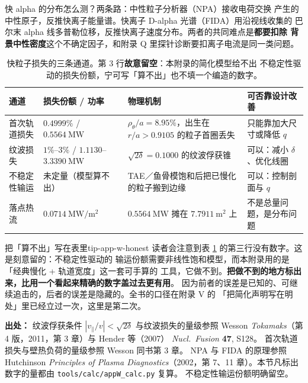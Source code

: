 快 alpha 的分布怎么测？两条路：中性粒子分析器（NPA）接收电荷交换
产生的中性原子，反推快离子能量谱。快离子 D-alpha 光谱（FIDA）用沿视线收集的
巴尔末 alpha 线多普勒位移，反推快离子速度分布。两者的共同难点是\textbf{都要扣除
背景中性密度}这个不确定因子，和附录 Q 里探针诊断要扣离子电流是同一类问题。

\begin{table}[htbp]
\centering
\caption{快粒子损失的三条通道。第 3 行\textbf{故意留空}：本附录的简化模型给不出
不稳定性驱动的损失份额，宁可写「算不出」也不填一个编造的数字。}
\label{tab:app-w-loss}
\begin{tabular}{@{}p{2.4cm}p{2.7cm}p{3.2cm}p{3.5cm}@{}}
\hline
通道 & 损失份额 / 功率 & 物理机制 & 可否靠设计改善 \\
\hline
首次轨道损失 & $0.4999\%$ / $0.5564\ \mathrm{MW}$ &
$\rho_\theta/a=8.95\%$，出生在 $r/a>0.9105$ 的粒子首圈丢失 &
只能靠加大尺寸或降低 $q$ \\
纹波损失 & $1\%$--$3\%$ / $1.1130$--$3.3390\ \mathrm{MW}$ &
$\sqrt{2\delta}=0.1000$ 的纹波俘获锥 & 可以：减小 $\delta$、优化线圈 \\
不稳定性输运 & 未定量（模型算不出） &
TAE／鱼骨模饱和后把已慢化的粒子搬到边缘 & 可以：控制剖面与 $q$ \\
\hline
落点热流 & $0.0714\ \mathrm{MW/m^2}$ &
$0.5564\ \mathrm{MW}$ 摊在 $7.7911\ \mathrm{m^2}$ 上 &
不是总量问题，是分布问题 \\
\hline
\end{tabular}

\end{table}

\begin{tip}{把「算不出」写在表里}{tip-app-w-honest}
读者会注意到表 \ref{tab:app-w-loss} 的第三行没有数字。这是刻意留的：不稳定性驱动的
输运份额需要非线性饱和模型，而本附录用的是「经典慢化 + 轨道宽度」这一套可手算的
工具，它做不到。\textbf{把做不到的地方标出来，比用一个看起来精确的数字盖过去更有用}。
因为前者的误差是已知的、可继续追击的，后者的误差是隐藏的。全书的口径在附录 V 的
「把简化声明写在明处」里已经立过一次，这里是第二次。
\end{tip}

{\footnotesize
\textbf{出处：} 纹波俘获条件 $|v_\parallel/v|<\sqrt{2\delta}$ 与纹波损失的量级参照
Wesson \textit{Tokamaks}（第 4 版，2011，第 3 章）与 Hender 等（2007）
\textit{Nucl.\ Fusion} \textbf{47}, S128。
首次轨道损失与壁热负荷的量级参照
Wesson 同书第 3 章。
NPA 与 FIDA 的原理参照 Hutchinson \textit{Principles of Plasma
Diagnostics}（2002，第 7、11 章）。本节凡标出数字的量都由
\texttt{tools/\allowbreak{}calc/\allowbreak{}appW\_calc.py} 复算。
不稳定性输运份额明确留空。
}

